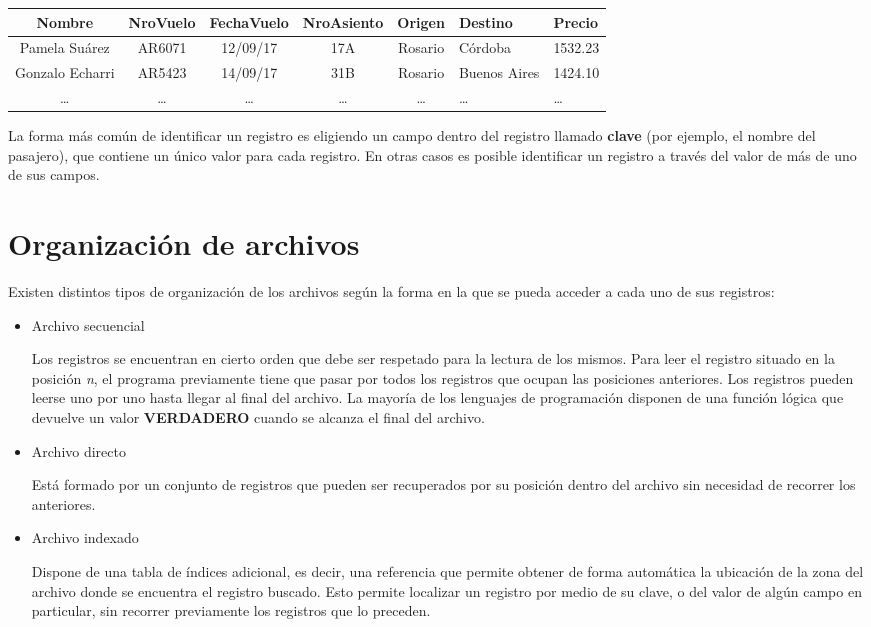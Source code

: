 \documentclass[]{book}
\begin{document}
\begin{longtable}[]{@{}cccccll@{}}
\toprule
Nombre & NroVuelo & FechaVuelo & NroAsiento & Origen & Destino & Precio\tabularnewline
\midrule
\endhead
Pamela Suárez & AR6071 & 12/09/17 & 17A & Rosario & Córdoba & 1532.23\tabularnewline
Gonzalo Echarri & AR5423 & 14/09/17 & 31B & Rosario & Buenos Aires & 1424.10\tabularnewline
\ldots{} & \ldots{} & \ldots{} & \ldots{} & \ldots{} & \ldots{} & \ldots{}\tabularnewline
\bottomrule
\end{longtable}

La forma más común de identificar un registro es eligiendo un campo dentro del registro llamado \textbf{clave} (por ejemplo, el nombre del pasajero), que contiene un único valor para cada registro. En otras casos es posible identificar un registro a través del valor de más de uno de sus campos.

\hypertarget{organizacion-de-archivos}{%
\section{Organización de archivos}\label{organizacion-de-archivos}}

Existen distintos tipos de organización de los archivos según la forma en la que se pueda acceder a cada uno de sus registros:

\begin{itemize}
\item
  Archivo secuencial

  Los registros se encuentran en cierto orden que debe ser respetado para la lectura de los mismos. Para leer el registro situado en la posición \emph{n}, el programa previamente tiene que pasar por todos los registros que ocupan las posiciones anteriores. Los registros pueden leerse uno por uno hasta llegar al final del archivo. La mayoría de los lenguajes de programación disponen de una función lógica que devuelve un valor \textbf{VERDADERO} cuando se alcanza el final del archivo.
\item
  Archivo directo

  Está formado por un conjunto de registros que pueden ser recuperados por su posición dentro del archivo sin necesidad de recorrer los anteriores.
\item
  Archivo indexado

  Dispone de una tabla de índices adicional, es decir, una referencia que permite obtener de forma automática la ubicación de la zona del archivo donde se encuentra el registro buscado. Esto permite localizar un registro por medio de su clave, o del valor de algún campo en particular, sin recorrer previamente los registros que lo preceden.
\end{itemize}
\end{document}
